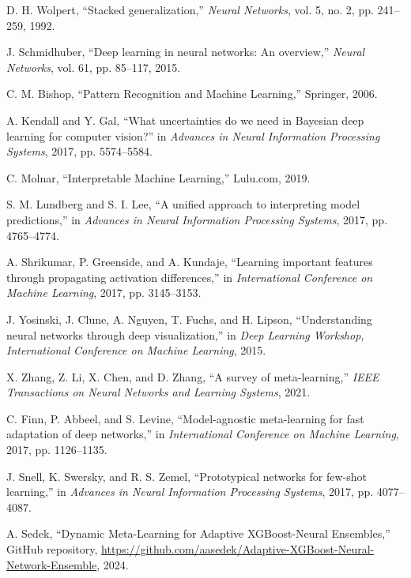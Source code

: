 \documentclass[10pt,journal,compsoc]{IEEEtran}
\begin{document}
\begin{thebibliography}{1}
D. H. Wolpert, ``Stacked generalization,'' \textit{Neural Networks}, vol. 5, no. 2, pp. 241--259, 1992.

J. Schmidhuber, ``Deep learning in neural networks: An overview,'' \textit{Neural Networks}, vol. 61, pp. 85--117, 2015.

C. M. Bishop, ``Pattern Recognition and Machine Learning,'' Springer, 2006.

A. Kendall and Y. Gal, ``What uncertainties do we need in Bayesian deep learning for computer vision?'' in \textit{Advances in Neural Information Processing Systems}, 2017, pp. 5574--5584.

C. Molnar, ``Interpretable Machine Learning,'' Lulu.com, 2019.

S. M. Lundberg and S. I. Lee, ``A unified approach to interpreting model predictions,'' in \textit{Advances in Neural Information Processing Systems}, 2017, pp. 4765--4774.

A. Shrikumar, P. Greenside, and A. Kundaje, ``Learning important features through propagating activation differences,'' in \textit{International Conference on Machine Learning}, 2017, pp. 3145--3153.

J. Yosinski, J. Clune, A. Nguyen, T. Fuchs, and H. Lipson, ``Understanding neural networks through deep visualization,'' in \textit{Deep Learning Workshop, International Conference on Machine Learning}, 2015.

X. Zhang, Z. Li, X. Chen, and D. Zhang, ``A survey of meta-learning,'' \textit{IEEE Transactions on Neural Networks and Learning Systems}, 2021.

C. Finn, P. Abbeel, and S. Levine, ``Model-agnostic meta-learning for fast adaptation of deep networks,'' in \textit{International Conference on Machine Learning}, 2017, pp. 1126--1135.

J. Snell, K. Swersky, and R. S. Zemel, ``Prototypical networks for few-shot learning,'' in \textit{Advances in Neural Information Processing Systems}, 2017, pp. 4077--4087.

A. Sedek, ``Dynamic Meta-Learning for Adaptive XGBoost-Neural Ensembles,'' GitHub repository, 
\url{https://github.com/aasedek/Adaptive-XGBoost-Neural-Network-Ensemble}, 2024.

\end{thebibliography}
\end{document}
